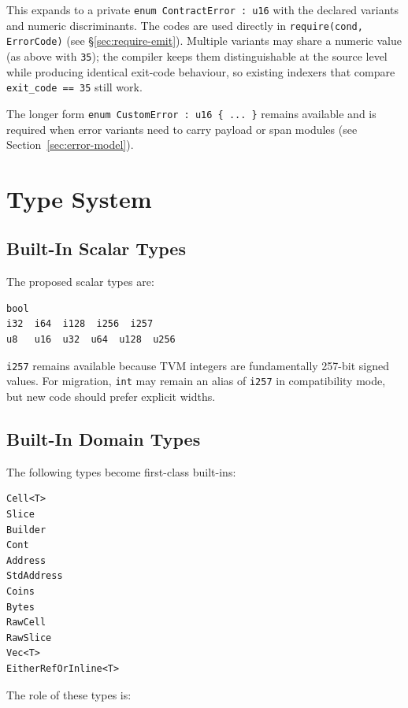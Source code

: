 \documentclass[12pt,oneside]{article}
\begin{document}
This expands to a private \verb|enum ContractError : u16|
with the declared variants and numeric discriminants. The codes are
used directly in \verb|require(cond, ErrorCode)| (see
\S\ref{sec:require-emit}). Multiple variants may share a numeric value
(as above with \verb|35|); the compiler keeps them distinguishable at
the source level while producing identical exit-code behaviour, so
existing indexers that compare \verb|exit_code == 35| still work.

The longer form \verb|enum CustomError : u16 { ... }| remains
available and is required when error variants need to carry payload or
span modules (see Section~\ref{sec:error-model}).

\section{Type System}
\label{sec:v050-types}
\subsection{Built-In Scalar Types}
The proposed scalar types are:

\begin{verbatim}
bool
i32  i64  i128  i256  i257
u8   u16  u32  u64  u128  u256
\end{verbatim}

\verb|i257| remains available because TVM integers are fundamentally 257-bit
signed values. For migration, \verb|int| may remain an alias of \verb|i257| in
compatibility mode, but new code should prefer explicit widths.

\subsection{Built-In Domain Types}
The following types become first-class built-ins:

\begin{verbatim}
Cell<T>
Slice
Builder
Cont
Address
StdAddress
Coins
Bytes
RawCell
RawSlice
Vec<T>
EitherRefOrInline<T>
\end{verbatim}

The role of these types is:
\end{document}
